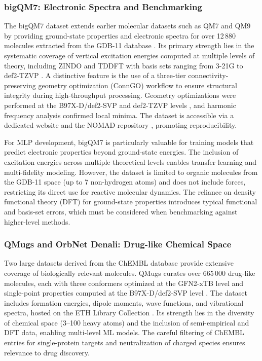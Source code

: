 \documentclass[12pt]{article}
\begin{document}
\subsubsection*{bigQM7: Electronic Spectra and Benchmarking}

The bigQM7 dataset \cite{ds17-9} extends earlier molecular datasets such as QM7 \cite{ds17-77} and QM9 \cite{ds17-1} by providing ground-state properties and electronic spectra for over 12\,880 molecules extracted from the GDB-11 database \cite{ds17-95,ds17-96}. Its primary strength lies in the systematic coverage of vertical excitation energies computed at multiple levels of theory, including ZINDO and TDDFT with basis sets ranging from 3-21G to def2-TZVP \cite{ds17-92}. A distinctive feature is the use of a three-tier connectivity-preserving geometry optimization (ConnGO) workflow \cite{ds17-108} to ensure structural integrity during high-throughput processing. Geometry optimizations were performed at the B97X-D/def2-SVP and def2-TZVP levels \cite{ds17-85,ds17-92}, and harmonic frequency analysis confirmed local minima. The dataset is accessible via a dedicated website and the NOMAD repository \cite{ds17-9}, promoting reproducibility.

For MLP development, bigQM7 is particularly valuable for training models that predict electronic properties beyond ground-state energies. The inclusion of excitation energies across multiple theoretical levels enables transfer learning and multi-fidelity modeling. However, the dataset is limited to organic molecules from the GDB-11 space (up to 7 non-hydrogen atoms) and does not include forces, restricting its direct use for reactive molecular dynamics. The reliance on density functional theory (DFT) for ground-state properties introduces typical functional and basis-set errors, which must be considered when benchmarking against higher-level methods.

\subsubsection*{QMugs and OrbNet Denali: Drug-like Chemical Space}

Two large datasets derived from the ChEMBL database provide extensive coverage of biologically relevant molecules. QMugs \cite{ds18-41} curates over 665\,000 drug-like molecules, each with three conformers optimized at the GFN2-xTB level \cite{ds18-112,ds18-113} and single-point properties computed at the B97X-D/def2-SVP level \cite{ds18-92}. The dataset includes formation energies, dipole moments, wave functions, and vibrational spectra, hosted on the ETH Library Collection \cite{ds18-114}. Its strength lies in the diversity of chemical space (3--100 heavy atoms) and the inclusion of semi-empirical and DFT data, enabling multi-level ML models. The careful filtering of ChEMBL entries for single-protein targets and neutralization of charged species ensures relevance to drug discovery.
\end{document}
